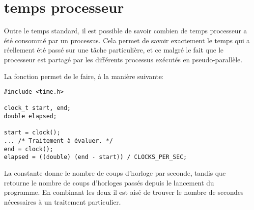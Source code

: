 \section{temps processeur}

Outre le temps standard, il est possible de savoir combien de temps processeur a été consommé par un processus. Cela permet de savoir exactement le temps qui a réellement été passé sur une tâche particulière, et ce malgré le fait que le processeur est partagé par les différents processus exécutés en pseudo-parallèle.

La fonction  permet de le faire, à la manière suivante:

\begin{lstlisting}[frame=trBL]
#include <time.h>

clock_t start, end;
double elapsed;

start = clock();
... /* Traitement à évaluer. */
end = clock();
elapsed = ((double) (end - start)) / CLOCKS_PER_SEC;
\end{lstlisting}

La constante  donne le nombre de coups d'horloge par seconde, tandis que  retourne le nombre de coups d'horloges passés depuis le lancement du programme. En combinant les deux il est aisé de trouver le nombre de secondes nécessaires à un traitement particulier.




